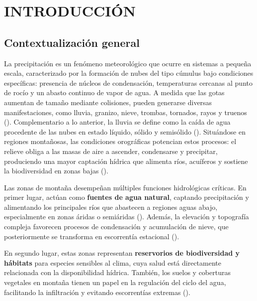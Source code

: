 \chapter{INTRODUCCIÓN}
\setcounter{page}{1}
\section{Contextualización general}

La precipitación es un fenómeno meteorológico que ocurre en sistemas a pequeña escala, caracterizado por la formación de nubes del tipo cúmulus bajo condiciones específicas: presencia de núcleos de condensación, temperaturas cercanas al punto de rocío y un abasto continuo de vapor de agua. A medida que las gotas aumentan de tamaño mediante colisiones, pueden generarse diversas manifestaciones, como lluvia, granizo, nieve, trombas, tornados, rayos y truenos (\cite{ahrens2020}). Complementario a lo anterior, la lluvia se define como la caída de agua procedente de las nubes en estado líquido, sólido y semisólido (\cite{breña2013}). Situándose en regiones montañosas, las condiciones orográficas potencian estos procesos: el relieve obliga a las masas de aire a ascender, condensarse y precipitar, produciendo una mayor captación hídrica que alimenta ríos, acuíferos y sostiene la biodiversidad en zonas bajas (\cite{jiang2003moist, viviroli2007mountain}).




Las zonas de montaña desempeñan múltiples funciones hidrológicas críticas. En primer lugar, actúan como \textbf{fuentes de agua natural}, captando precipitación y alimentando los principales ríos que abastecen a regiones aguas abajo, especialmente en zonas áridas o semiáridas  (\cite{viviroli2007mountain}). Además, la elevación y topografía compleja favorecen procesos de condensación y acumulación de nieve, que posteriormente se transforma en escorrentía estacional  (\cite{immerzeel2020importance}). 

En segundo lugar, estas zonas representan \textbf{reservorios de biodiversidad y hábitats} para especies sensibles al clima, cuya salud está directamente relacionada con la disponibilidad hídrica. También, los suelos y coberturas vegetales en montaña tienen un papel en la regulación del ciclo del agua, facilitando la infiltración y evitando escorrentías extremas  (\cite{buytaert2011mountain}).

